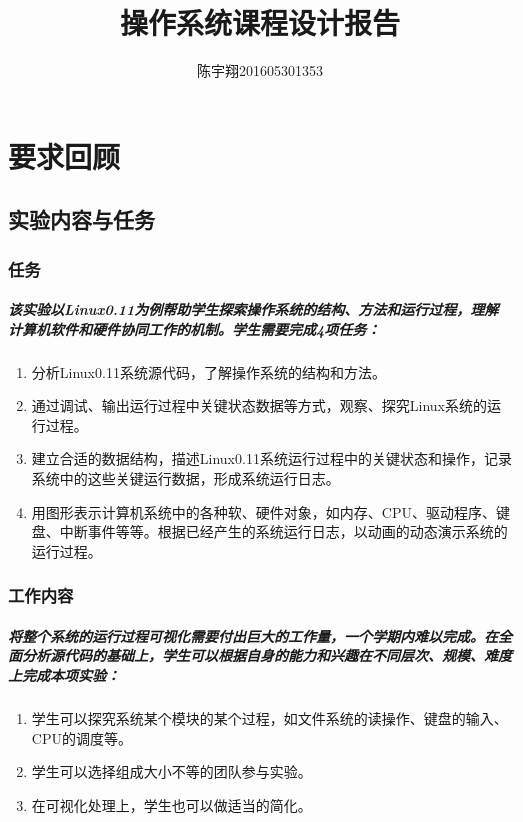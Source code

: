 \documentclass[]{report}
\title{操作系统课程设计报告}
\author{陈宇翔201605301353}
\begin{document}
\maketitle

\tableofcontents

\part{要求回顾}

\chapter{实验内容与任务}

\section{任务}

\subsubsection*{该实验以Linux0.11为例帮助学生探索操作系统的结构、方法和运行过程，理解计算机软件和硬件协同工作的机制。学生需要完成4项任务：}
\begin{enumerate}[（1）]
    \item 分析Linux0.11系统源代码，了解操作系统的结构和方法。
    \item 通过调试、输出运行过程中关键状态数据等方式，观察、探究Linux系统的运行过程。
    \item 建立合适的数据结构，描述Linux0.11系统运行过程中的关键状态和操作，记录系统中的这些关键运行数据，形成系统运行日志。
    \item 用图形表示计算机系统中的各种软、硬件对象，如内存、CPU、驱动程序、键盘、中断事件等等。根据已经产生的系统运行日志，以动画的动态演示系统的运行过程。
\end{enumerate}

\section{工作内容}

\subsubsection*{将整个系统的运行过程可视化需要付出巨大的工作量，一个学期内难以完成。在全面分析源代码的基础上，学生可以根据自身的能力和兴趣在不同层次、规模、难度上完成本项实验：}
\begin{enumerate}[（1）]
    \item 学生可以探究系统某个模块的某个过程，如文件系统的读操作、键盘的输入、CPU的调度等。
    \item 学生可以选择组成大小不等的团队参与实验。
    \item 在可视化处理上，学生也可以做适当的简化。
\end{enumerate}
\end{document}
